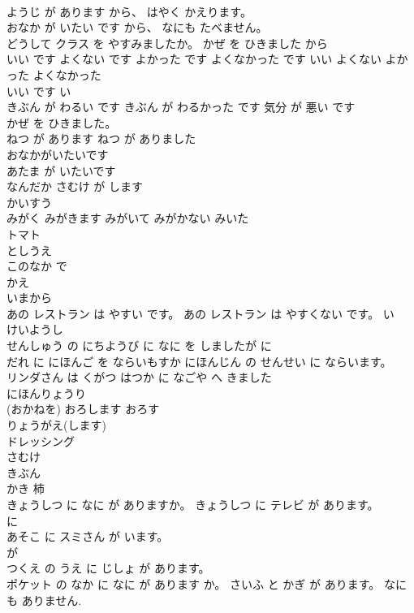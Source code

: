 \documentclass[8pt]{extreport}
\begin{document}
\begin{CJK}{UTF8}{min}
\\	ようじ が あります から、 はやく かえります。	
\\	おなか が いたい です から、 なにも たベません。	
\\	どうして クラス を やすみましたか。 かぜ を ひきました から	
\\	いい です よくない です よかった です よくなかった です	いい よくない よかった よくなかった	
\\	いい です	い 
\\	きぶん が わるい です きぶん が わるかった です	気分 が 悪い です
\\	かぜ を ひきました。	
\\	ねつ が あります ねつ が ありました	
\\	おなかがいたいです	
\\	あたま が いたいです	
\\	なんだか さむけ が します	
\\	かいすう	
\\	みがく	みがきます	みがいて	みがかない	みいた	
\\	トマト	
\\	としうえ	
\\	このなか で	
\\	かえ	
\\	いまから	
\\	あの レストラン は やすい です。 あの レストラン は やすくない です。	い 
\\	けいようし
\\	せんしゅう の にちようび に なに を しましたが	に 
\\	だれ に にほんご を ならいもすか にほんじん の せんせい に ならいます。	
\\	リンダさん は くがつ はつか に なごや へ きました	
\\	にほんりょうり	
\\	(おかねを) おろします	おろす 
\\	りょうがえ(します)	
\\	ドレッシング	
\\	さむけ	
\\	きぶん	
\\	かき	柿
\\	きょうしつ に なに が ありますか。 きょうしつ に テレビ が あります。	
\\	に 
\\	あそこ に スミさん が います。	
\\	が 
\\	つくえ の うえ に じしょ が あります。	
\\	ポケット の なか に なに が あります か。 さいふ と かぎ が あります。 なに も ありません.	

\end{CJK}
\end{document}
